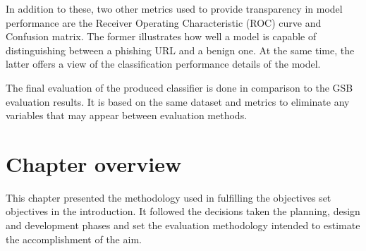 In addition to these, two other metrics used to provide transparency in model performance are the Receiver Operating Characteristic (ROC) curve and Confusion matrix. The former illustrates how well a model is capable of distinguishing between a phishing URL and a benign one. At the same time, the latter offers a view of the classification performance details of the model.

The final evaluation of the produced classifier is done in comparison to the GSB evaluation results. It is based on the same dataset and metrics to eliminate any variables that may appear between evaluation methods.

\section{Chapter overview}
This chapter presented the methodology used in fulfilling the objectives set objectives in the introduction. It followed the decisions taken the planning, design and development phases and set the evaluation methodology intended to estimate the accomplishment of the aim.